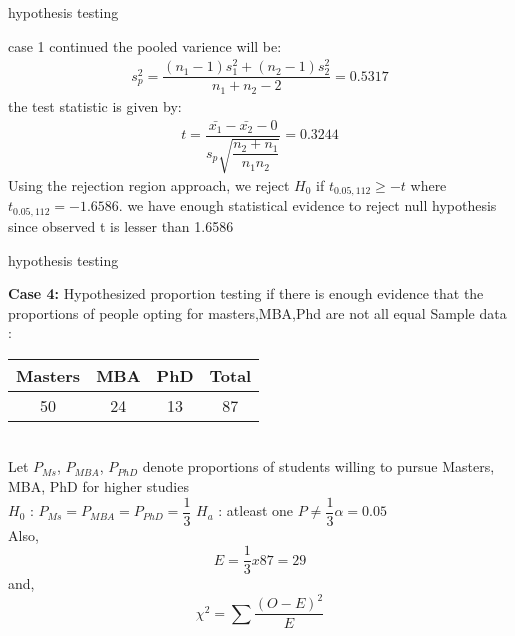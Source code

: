 \documentclass{beamer}
\begin{document}
    \begin{frame}{hypothesis testing}
    \begin{block}{case 1 continued}
        the pooled varience will be:
           \begin{align}
               s^2_p=\dfrac{(n_1-1)s^2_1+(n_2-1)s^2_2}{n_1+n_2-2}=0.5317
           \end{align}
           the test statistic is given by:
           \begin{align}
               t=\dfrac{\bar{x_1}-\bar{x_2}-0}{s_p\sqrt{\dfrac{n_2+n_1}{n_1n_2}}}=0.3244
           \end{align}
           Using the rejection region approach, we reject $H_0$ if $t_{0.05,112}\geq -t$ where $t_{0.05,112}=-1.6586$. we have enough statistical evidence to reject null hypothesis since observed t is lesser than 1.6586
           
    \end{block}
        
    \end{frame}
    \begin{frame}{hypothesis testing}
    
  \begin{block}{\textbf{Case 4:} Hypothesized proportion testing if there is enough evidence that the proportions of people opting for masters,MBA,Phd are not all equal}
    Sample data :
    \begin{tabular}{|c|c|c|c|}
        \hline
        Masters & MBA & PhD & Total\\
        \hline
        50 & 24 & 13 & 87 \\
        \hline
    \end{tabular}\\

    Let $P_{Ms}$, $P_{MBA}$, $P_{PhD}$ denote proportions of students willing to pursue Masters, MBA, PhD for higher studies \\

    $H_{0}$ :  $P_{Ms} = P_{MBA} = P_{PhD} = \dfrac{1}{3}$ \space \space \space \space $H_{a}$ : atleast one $P \neq \dfrac{1}{3}$\space \space \space \space $\alpha =0.05$\\

    Also,
    \begin{equation}
        E = \dfrac{1}{3} x 87 = 29
    \end{equation}
    and,
    \begin{equation}
        \chi^{2} = \sum\dfrac{(O - E)^{2}}{E}
    \end{equation}  
    \end{block}
\end{frame}
\end{document}
